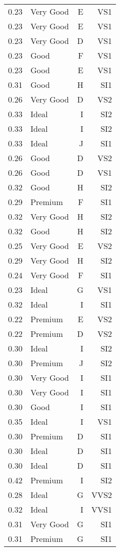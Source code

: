\documentclass[12pt,english,nohyper]{tufte-handout}\usepackage[]{graphicx}\usepackage[]{color}
\begin{document}
\begin{fullwidth}
\begin{longtable}{r|lr|r}
  0.23 & Very Good & E & VS1 \\ 
  0.23 & Very Good & E & VS1 \\ 
  0.23 & Very Good & D & VS1 \\ 
  0.23 & Good & F & VS1 \\ 
  0.23 & Good & E & VS1 \\ 
  0.31 & Good & H & SI1 \\ 
  0.26 & Very Good & D & VS2 \\ 
  0.33 & Ideal & I & SI2 \\ 
  0.33 & Ideal & I & SI2 \\ 
  0.33 & Ideal & J & SI1 \\ 
  0.26 & Good & D & VS2 \\ 
  0.26 & Good & D & VS1 \\ 
  0.32 & Good & H & SI2 \\ 
  0.29 & Premium & F & SI1 \\ 
  0.32 & Very Good & H & SI2 \\ 
  0.32 & Good & H & SI2 \\ 
  0.25 & Very Good & E & VS2 \\ 
  0.29 & Very Good & H & SI2 \\ 
  0.24 & Very Good & F & SI1 \\ 
  0.23 & Ideal & G & VS1 \\ 
  0.32 & Ideal & I & SI1 \\ 
  0.22 & Premium & E & VS2 \\ 
  0.22 & Premium & D & VS2 \\ 
  0.30 & Ideal & I & SI2 \\ 
  0.30 & Premium & J & SI2 \\ 
  0.30 & Very Good & I & SI1 \\ 
  0.30 & Very Good & I & SI1 \\ 
  0.30 & Good & I & SI1 \\ 
  0.35 & Ideal & I & VS1 \\ 
  0.30 & Premium & D & SI1 \\ 
  0.30 & Ideal & D & SI1 \\ 
  0.30 & Ideal & D & SI1 \\ 
  0.42 & Premium & I & SI2 \\ 
  0.28 & Ideal & G & VVS2 \\ 
  0.32 & Ideal & I & VVS1 \\ 
  0.31 & Very Good & G & SI1 \\ 
  0.31 & Premium & G & SI1 \\ 

\end{longtable}
\end{fullwidth}
\end{document}
